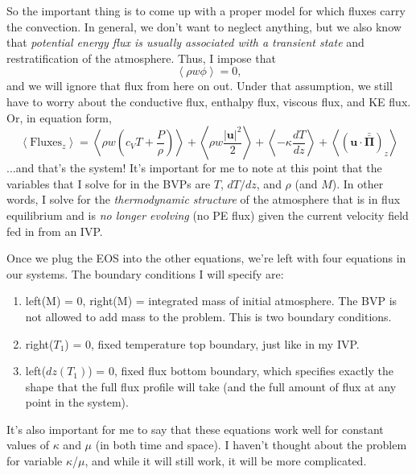 \documentclass[aps, pre, onecolumn, nofootinbib, notitlepage, groupedaddress, amsfonts, amssymb, amsmath, longbibliography]{revtex4-1}
\newcommand{\angles}[1]{\ensuremath{\left\langle #1 \right\rangle}}
\newcommand{\stressT}{\ensuremath{\bm{\bar{\bar{\Pi}}}}}
\begin{document}
So the important thing is to come up with a proper model for which fluxes carry the convection.
In general, we don't want to neglect anything, but we also know that \emph{potential energy
flux is usually associated with a transient state} and restratification of the atmosphere.
Thus, I impose that
\begin{equation}
\angles{\rho w \phi} = 0,
\end{equation}
and we will ignore that flux from here on out.  Under that assumption, we still have to
worry about the conductive flux, enthalpy flux, viscous flux, and KE flux.  Or, in
equation form,
\begin{equation}
\angles{\text{Fluxes}_z} = \angles{\rho w \left(c_V T + \frac{P}{\rho}\right)}
+ \angles{\rho w \frac{|\bm{u}|^2}{2}} + \angles{-\kappa \frac{d T}{dz}}
+ \angles{(\bm{u}\cdot\stressT)_z}
\end{equation}
...and that's the system!  It's important for me to note at this point that the
variables that I solve for in the BVPs are $T$, $dT/dz$, and $\rho$ (and $M$).
In other words, I solve for the \emph{thermodynamic structure} of the atmosphere
that is in flux equilibrium and is \emph{no longer evolving} (no PE flux) given the
current velocity field fed in from an IVP.  

Once we plug the EOS into the other equations,
we're left with four equations in our systems.  The boundary conditions I will specify are:
\begin{enumerate}
\item left(M) = 0, right(M) = integrated mass of initial atmosphere.  The BVP is
not allowed to add mass to the problem.  This is two boundary conditions.
\item right($T_1$) = 0, fixed temperature top boundary, just like in my IVP.
\item left($dz(T_1)$) = 0, fixed flux bottom boundary, which specifies exactly the shape
that the full flux profile will take (and the full amount of flux at any point in the
system).
\end{enumerate}

It's also important for me to say that these equations work well for constant values
of $\kappa$ and $\mu$ (in both time and space).  I haven't thought about the problem
for variable $\kappa$/$\mu$, and while it will still work, it will be more complicated.
\end{document}
